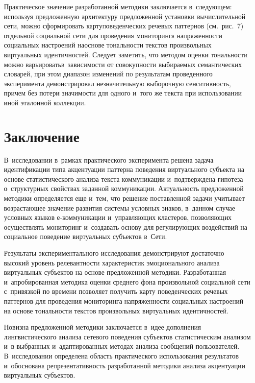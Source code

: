 \begin{multicols}{2}
  \smallskip
  
  Практическое значение разработанной методики заключается в~следующем: 
используя предложенную архитектуру предложенной установки 
вычислительной сети, можно сформировать карту\linebreak поведенческих речевых 
паттернов (см.\ рис.~7) отдельной социальной сети для проведения 
мониторинга напряженности социальных настроений на\linebreak основе тональности 
текстов произвольных виртуальных идентичностей. Следует заметить, что 
методом оценки тональности можно варьировать\linebreak в~зависимости от 
совокупности выбираемых семантических словарей, при этом диапазон 
изменений по результатам проведенного эксперимента демонстрировал 
незначительную выборочную сенситивность, причем без потери значимости 
для одного и~того же текста при использовании иной эталонной коллекции.

\section{Заключение}

  В~исследовании в~рамках практического эксперимента решена задача 
идентификации типа акцентуации паттерна поведения виртуального субъекта 
на основе статистического анализа текста коммуникации и~подтверждена 
гипотеза о~структурных свойствах заданной коммуникации. Актуальность 
предложенной методики определяется еще и~тем, что решение поставленной 
задачи учитывает возрастающее значение развития системы условных знаков, 
в~данном случае условных языков е-ком\-му\-ни\-ка\-ции и~управляющих 
кластеров, позволяющих осуществлять мониторинг и~создавать основу для 
регулирующих воздействий на социальное поведение виртуальных субъектов 
в~Сети.
  
  Результаты экспериментального исследования демонстрируют достаточно 
высокий уровень релевантности характеристик эмоционального анализа 
виртуальных субъектов на основе предложенной методики. Разработанная 
и~апробированная методика оценки среднего фона произвольной социальной 
сети с~привязкой по времени позволяет получить карту поведенческих речевых 
паттернов для проведения мониторинга напряженности социальных настроений 
на основе тональности текстов произвольных виртуальных идентичностей.
  
  Новизна предложенной методики заключается в~идее дополнения 
лингвистического анализа сетевого поведения субъектов статистическим 
анализом и~в выбранных и~адаптированных методах анализа сообщений 
пользователей. В~исследовании определена область практического 
использования результатов и~обоснована репрезентативность разработанной 
методики анализа акцентуации виртуальных субъектов.
  

\end{multicols}
